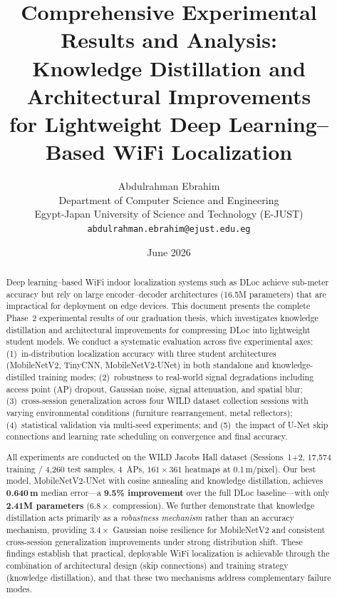\documentclass[11pt,a4paper]{article}
\title{%
  Comprehensive Experimental Results and Analysis:\\
  Knowledge Distillation and Architectural Improvements\\
  for Lightweight Deep Learning--Based WiFi Localization%
}
\author{
  Abdulrahman Ebrahim\\
  Department of Computer Science and Engineering\\
  Egypt-Japan University of Science and Technology (E-JUST)\\
  \texttt{abdulrahman.ebrahim@ejust.edu.eg}
}
\date{June 2026}
\begin{document}
\maketitle

\begin{abstract}
Deep learning--based WiFi indoor localization systems such as DLoc achieve sub-meter accuracy but rely on large encoder--decoder architectures (16.5M parameters) that are impractical for deployment on edge devices.
This document presents the complete Phase~2 experimental results of our graduation thesis, which investigates knowledge distillation and architectural improvements for compressing DLoc into lightweight student models.
We conduct a systematic evaluation across five experimental axes:
(1)~in-distribution localization accuracy with three student architectures (MobileNetV2, TinyCNN, MobileNetV2-UNet) in both standalone and knowledge-distilled training modes;
(2)~robustness to real-world signal degradations including access point (AP) dropout, Gaussian noise, signal attenuation, and spatial blur;
(3)~cross-session generalization across four WILD dataset collection sessions with varying environmental conditions (furniture rearrangement, metal reflectors);
(4)~statistical validation via multi-seed experiments; and
(5)~the impact of U-Net skip connections and learning rate scheduling on convergence and final accuracy.

All experiments are conducted on the WILD Jacobs Hall dataset (Sessions~1+2, 17{,}574 training / 4{,}260 test samples, 4~APs, $161\!\times\!361$ heatmaps at $0.1$\,m/pixel).
Our best model, MobileNetV2-UNet with cosine annealing and knowledge distillation, achieves \textbf{0.640\,m} median error---a \textbf{9.5\% improvement} over the full DLoc baseline---with only \textbf{2.41M parameters} ($6.8\times$ compression).
We further demonstrate that knowledge distillation acts primarily as a \emph{robustness mechanism} rather than an accuracy mechanism, providing $3.4\times$ Gaussian noise resilience for MobileNetV2 and consistent cross-session generalization improvements under strong distribution shift.
These findings establish that practical, deployable WiFi localization is achievable through the combination of architectural design (skip connections) and training strategy (knowledge distillation), and that these two mechanisms address complementary failure modes.
\end{abstract}
\end{document}
